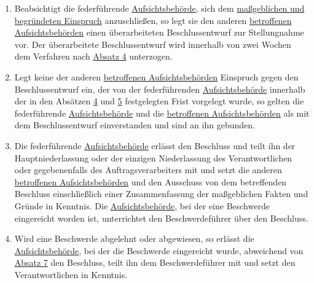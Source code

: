 \begin{enumerate}
  \item Beabsichtigt die federführende \hyperref[itm:04-21]{Aufsichtsbehörde}, sich dem \hyperref[itm:04-27]{maßgeblichen und begründeten Einspruch} anzuschließen,
   so legt sie den anderen \hyperref[itm:04-22]{betroffenen Aufsichtsbehörden} einen überarbeiteten Beschlussentwurf zur Stellungnahme vor.
   Der überarbeitete Beschlussentwurf wird innerhalb von zwei Wochen dem Verfahren nach \hyperref[itm:60-4]{Absatz 4}
   unterzogen.
  \label{itm:60-5}

  \item Legt keine der anderen \hyperref[itm:04-22]{betroffenen Aufsichtsbehörden} Einspruch gegen den Beschlussentwurf ein, der von der
   federführenden \hyperref[itm:04-21]{Aufsichtsbehörde} innerhalb der in den Absätzen \hyperref[itm:60-4]{4} und \hyperref[itm:60-5]
   {5} festgelegten Frist vorgelegt wurde, so gelten die federführende \hyperref[itm:04-21]{Aufsichtsbehörde} und die \hyperref[itm:04-22]{betroffenen
   Aufsichtsbehörden} als mit dem Beschlussentwurf einverstanden und sind an ihn gebunden.
  \label{itm:60-6}

  \item Die federführende \hyperref[itm:04-21]{Aufsichtsbehörde} erlässt den Beschluss und teilt ihn der Hauptniederlassung oder der einzigen
   Niederlassung des Verantwortlichen oder gegebenenfalls des Auftragsverarbeiters mit und setzt die anderen
   \hyperref[itm:04-22]{betroffenen Aufsichtsbehörden} und den Ausschuss von dem betreffenden Beschluss einschließlich einer Zusammenfassung
   der maßgeblichen Fakten und Gründe in Kenntnis. Die \hyperref[itm:04-21]{Aufsichtsbehörde}, bei der eine Beschwerde eingereicht worden
   ist, unterrichtet den Beschwerdeführer über den Beschluss.
  \label{itm:60-7}

  \item Wird eine Beschwerde abgelehnt oder abgewiesen, so erlässt die \hyperref[itm:04-21]{Aufsichtsbehörde}, bei der die Beschwerde
   eingereicht wurde, abweichend von \hyperref[itm:60-7]{Absatz 7} den Beschluss, teilt ihn dem Beschwerdeführer mit
   und setzt den Verantwortlichen in Kenntnis.
  \label{itm:60-8}


\end{enumerate}
